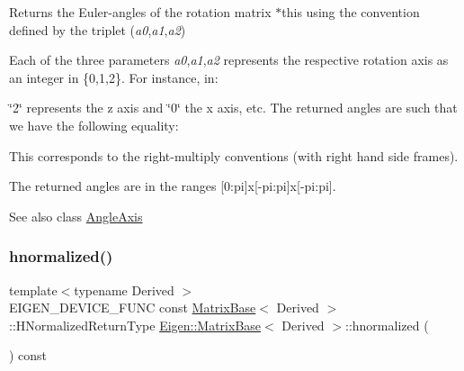 \begin{DoxyReturn}{Returns}
the Euler-\/angles of the rotation matrix {\ttfamily $\ast$this} using the convention defined by the triplet ({\itshape a0},{\itshape a1},{\itshape a2})
\end{DoxyReturn}
Each of the three parameters {\itshape a0},{\itshape a1},{\itshape a2} represents the respective rotation axis as an integer in \{0,1,2\}. For instance, in\+: 
\begin{DoxyCode}{0}
\end{DoxyCode}
 \char`\"{}2\char`\"{} represents the z axis and \char`\"{}0\char`\"{} the x axis, etc. The returned angles are such that we have the following equality\+: 
\begin{DoxyCode}{0}
\end{DoxyCode}
 This corresponds to the right-\/multiply conventions (with right hand side frames).

The returned angles are in the ranges \mbox{[}0\+:pi\mbox{]}x\mbox{[}-\/pi\+:pi\mbox{]}x\mbox{[}-\/pi\+:pi\mbox{]}.

\begin{DoxySeeAlso}{See also}
class \mbox{\hyperlink{class_eigen_1_1_angle_axis}{Angle\+Axis}} 
\end{DoxySeeAlso}
\mbox{\label{group___geometry___module_gad7e913733107a9a1b61bff95ec9c03dd}} 
\subsubsection{\texorpdfstring{hnormalized()}{hnormalized()}\hspace{0.1cm}{\footnotesize\ttfamily [1/2]}}
{\footnotesize\ttfamily template$<$typename Derived $>$ \\
E\+I\+G\+E\+N\+\_\+\+D\+E\+V\+I\+C\+E\+\_\+\+F\+U\+NC const \mbox{\hyperlink{class_eigen_1_1_matrix_base}{Matrix\+Base}}$<$ Derived $>$\+::H\+Normalized\+Return\+Type \mbox{\hyperlink{class_eigen_1_1_matrix_base}{Eigen\+::\+Matrix\+Base}}$<$ Derived $>$\+::hnormalized (\begin{DoxyParamCaption}{ }\end{DoxyParamCaption}) const\hspace{0.3cm}{\ttfamily [inline]}}



